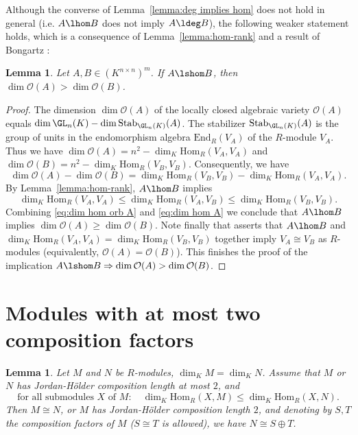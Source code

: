 \documentclass[12pt]{amsart}
\newtheorem{lemma}[theorem]{\bf Lemma}
\newcommand{\field}{K}
\renewcommand{\hom}{\mathrm{Hom}}
\begin{document}
Although the converse of Lemma~\ref{lemma:deg implies hom} does not hold in general (i.e. 
$A\lhom B$ does not imply $A\ldeg B$), the following weaker 
statement holds, which is a consequence of Lemma~\ref{lemma:hom-rank} and a result of 
Bongartz \cite{Bongartz2}: 

\begin{lemma}\label{lemma:hom order implies dim ineq}
Let $A,B\in (\field^{n\times n})^m$. 
If $A\lshom B$, then $\dim \mathcal{O}(A)>\dim \mathcal{O}(B)$. 
\end{lemma}

\begin{proof} 
The dimension $\dim\mathcal{O}(A)$ of the locally closed algebraic variety 
$\mathcal{O}(A)$ equals $\dim\GL_n(\field)-\dim\mathrm{Stab}_{\GL_n(\field)}(A)$. 
The stabilizer $\mathrm{Stab}_{\GL_n(\field)}(A)$ is the group of units in the endomorphism algebra 
$\mathrm{End}_R(V_A)$ of the $R$-module $V_A$. 
Thus we have $\dim\mathcal{O}(A)=n^2-\dim_\field\hom_R(V_A,V_A)$ and 
$\dim\mathcal{O}(B)=n^2-\dim_\field\hom_R(V_B,V_B)$. 
Consequently, we have 
\begin{equation}\label{eq:dim hom orb A}
  \dim\mathcal{O}(A)-\dim\mathcal{O}(B)=
  \dim_\field\hom_R(V_B,V_B)-\dim_\field\hom_R(V_A,V_A).
\end{equation}
By Lemma~\ref{lemma:hom-rank}, $A\lhom B$ implies 
\begin{equation}\label{eq:dim hom A}
    \dim_\field\hom_R(V_A,V_A)\le \dim_\field\hom_R(V_A,V_B)\le 
\dim_\field\hom_R(V_B,V_B).\end{equation}
Combining \eqref{eq:dim hom orb A} and \eqref{eq:dim hom A} we conclude that 
$A\lhom B$ implies $\dim\mathcal{O}(A)\ge \dim\mathcal{O}(B)$. 
Note finally that \cite[Lemma 1.2]{Bongartz2} asserts that 
$A\lhom B$ and 
$\dim_\field\hom_R(V_A,V_A)=\dim_\field\hom_R(V_B,V_B)$ 
together imply $V_A\cong V_B$ as $R$-modules (equivalently, 
$\mathcal{O}(A)=\mathcal{O}(B)$). 
This finishes the proof of the implication $A\lshom B\Rightarrow 
\dim \mathcal{O}(A)>\dim \mathcal{O}(B)$.  
\end{proof} 

\section{Modules with at most two composition factors}
\label{sec:two composition factors}

\begin{lemma}\label{lemma:S,T,M} 
    Let $M$ and $N$ be $R$-modules, $\dim_\field M=\dim_\field N$.  
    Assume that $M$ 
    or $N$ has 
    Jordan-Hölder composition length at most $2$, and 
    \begin{equation}\label{eq:hom(X,M)}
      \text{for all submodules }X \text{ of }M\colon \quad   \dim_{\field}\hom_{R}(X, M) \leq \dim_{\field}\hom_{R}(X, N).
    \end{equation}    
    Then $M\cong N$, or $M$ has Jordan-Hölder composition length $2$, and 
    denoting by $S,T$ the composition factors of $M$  ($S\cong T$ is allowed), we have 
    $N\cong S\oplus T$. 
\end{lemma}
\end{document}
